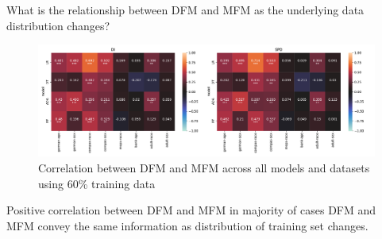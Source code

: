\documentclass[aspectratio=169]{beamer}
\begin{document}
\begin{frame}{What is the relationship between DFM and MFM as the
  underlying data distribution changes?}
  \begin{figure}
    \centering
    \includegraphics[width=0.95\linewidth]{heatmap--corr--training-sets-frac.pdf}
    \caption{Correlation between DFM and MFM across all models and
      datasets using 60\% training data}
    \label{fig:heatmap--corr--training-sets-frac}
  \end{figure}

  \begin{exampleblock}{Positive correlation between DFM and MFM in
    majority of cases}
    DFM and MFM convey the same information as distribution of
    training set changes.
  \end{exampleblock}
\end{frame}
\end{document}
